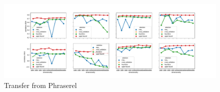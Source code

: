 \begin{figure}[b]
  \centering
    \includegraphics[width=\textwidth]{supplement/figures/PhraseRel-transfer}
    \caption{Transfer from Phraserel}
    \label{fig:phraserel-transfer}
\end{figure}

